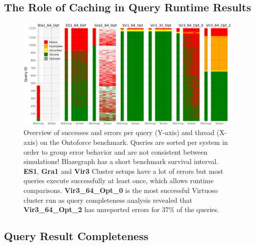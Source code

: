 \subsection{The Role of Caching in Query Runtime Results}
\label{subsec:caching}


\begin{figure}[htbp!]
	\centering
	\includegraphics[width=0.90\linewidth]{imgs/Fig09_FailuresOntoforceBM}
	\caption{Overview of successes and errors per query (Y-axis) and thread (X-axis) on the Ontoforce benchmark.
		Queries are sorted per system in order to group error behavior and are not consistent between simulations!
		Blazegraph has a short benchmark survival interval. \textbf{ES1}, \textbf{Gra1} and \textbf{Vir3} Cluster setups have a lot of errors but most queries execute successfully at least once, which allows runtime comparisons. \textbf{Vir3\_64\_Opt\_0} is the most successful Virtuoso cluster run as query completeness analysis revealed that \textbf{Vir3\_64\_Opt\_2} has unreported errors for 37\% of the queries.
	}
	\label{fig:Fig09_FailuresOntoforceBM}
\end{figure}



\subsection{Query Result Completeness}
\label{subsec:completeness}
